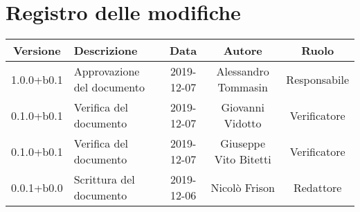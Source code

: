 \section*{Registro delle modifiche}

\begin{center}
	\begin{longtable}{|c|p{3cm}|c|c|c|}
	\hline
	\rowcolor{lighter-grayer}
	\textbf{Versione} & \textbf{Descrizione} & \textbf{Data} & \textbf{Autore} & \textbf{Ruolo} \\
	\hline
	\endfirsthead


	1.0.0+b0.1 & Approvazione del documento & 2019-12-07 & Alessandro Tommasin & Responsabile \\
	\hline
	0.1.0+b0.1 & Verifica del documento & 2019-12-07 & Giovanni Vidotto & Verificatore \\
	\hline
	0.1.0+b0.1 & Verifica del documento & 2019-12-07 & Giuseppe Vito Bitetti & Verificatore \\
	\hline
	0.0.1+b0.0 & Scrittura del documento & 2019-12-06 & Nicolò Frison & Redattore \\

	\hline

	\end{longtable}
\end{center}
